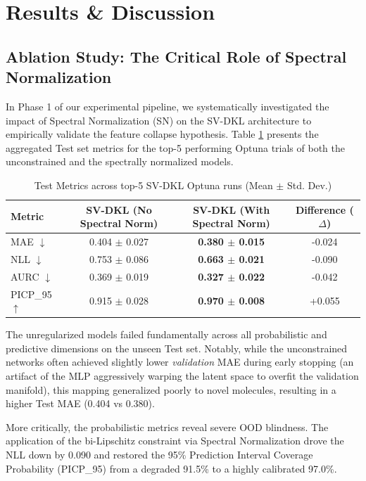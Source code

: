 \section{Results \& Discussion}

\subsection{Ablation Study: The Critical Role of Spectral Normalization}
In Phase 1 of our experimental pipeline, we systematically investigated the impact of Spectral Normalization (SN) on the SV-DKL architecture to empirically validate the feature collapse hypothesis. Table \ref{tab:spectral_norm} presents the aggregated Test set metrics for the top-5 performing Optuna trials of both the unconstrained and the spectrally normalized models. 

\begin{table}[h]
\centering
\caption{Test Metrics across top-5 SV-DKL Optuna runs (Mean $\pm$ Std. Dev.)}
\label{tab:spectral_norm}
\begin{tabular}{@{}lccc@{}}
\toprule
Metric & SV-DKL (No Spectral Norm) & SV-DKL (With Spectral Norm) & Difference ($\Delta$) \\ \midrule
MAE $\downarrow$ & 0.404 $\pm$ 0.027 & \textbf{0.380 $\pm$ 0.015} & -0.024 \\
NLL $\downarrow$ & 0.753 $\pm$ 0.086 & \textbf{0.663 $\pm$ 0.021} & -0.090 \\
AURC $\downarrow$ & 0.369 $\pm$ 0.019 & \textbf{0.327 $\pm$ 0.022} & -0.042 \\
PICP\_95 $\uparrow$ & 0.915 $\pm$ 0.028 & \textbf{0.970 $\pm$ 0.008} & +0.055 \\ \bottomrule
\end{tabular}
\end{table}

The unregularized models failed fundamentally across all probabilistic and predictive dimensions on the unseen Test set. Notably, while the unconstrained networks often achieved slightly lower \textit{validation} MAE during early stopping (an artifact of the MLP aggressively warping the latent space to overfit the validation manifold), this mapping generalized poorly to novel molecules, resulting in a higher Test MAE (0.404 vs 0.380).

More critically, the probabilistic metrics reveal severe OOD blindness. The application of the bi-Lipschitz constraint via Spectral Normalization drove the NLL down by 0.090 and restored the 95\% Prediction Interval Coverage Probability (PICP\_95) from a degraded 91.5\% to a highly calibrated 97.0\%. 

